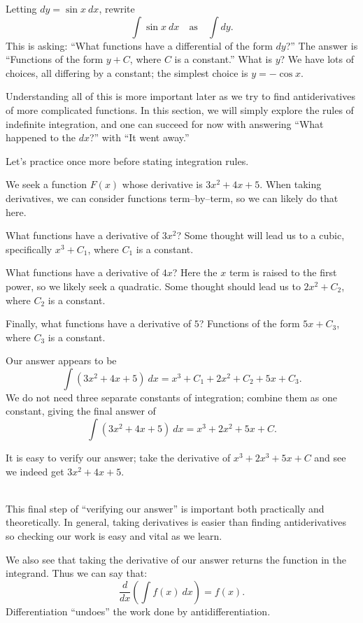 Letting $dy = \sin x\ dx$,  rewrite 
$$\int \sin x \ dx \quad \text{as}\quad \int  dy.$$
This is asking: ``What functions have a differential of the form $dy$?'' The answer is ``Functions of the form $y+C$, where $C$ is a constant.'' What is $y$? We have lots of choices, all differing by a constant; the simplest choice is $y = -\cos x$.

Understanding all of this is more important later as we try to find antiderivatives of more complicated functions. In this section, we will simply explore the rules of indefinite integration, and one can succeed for now with answering ``What happened to the $dx$?'' with ``It went away.''

Let's practice once more before stating integration rules.\\

{We seek a function $F(x)$ whose derivative is $3x^2+4x+5$. When taking derivatives, we can consider functions term--by--term, so we can likely do that here.

What functions have a derivative of $3x^2$? Some thought will lead us to a cubic, specifically $x^3+C_1$, where $C_1$ is a constant. 

What functions have a derivative of $4x$? Here the $x$ term is raised to the first power, so we likely seek a quadratic. Some thought should lead us to $2x^2+C_2$, where $C_2$ is a constant.

Finally, what functions have a derivative of $5$? Functions of the form $5x+C_3$, where $C_3$ is a constant.

Our answer appears to be 
$$\int (3x^2+4x+5)\ dx = x^3+C_1+2x^2+C_2+5x+C_3.$$ We do not need three separate constants of integration; combine them as one constant, giving the final answer of 
$$\int (3x^2+4x+5)\ dx = x^3+2x^2+5x+C.$$

It is easy to verify our answer; take the derivative of $x^3+2x^3+5x+C$ and see we indeed get $3x^2+4x+5$.
}\\

This final step of ``verifying our answer'' is important both practically and theoretically. In general, taking derivatives is easier than finding antiderivatives so checking our work is easy and vital as we learn.

We also see that taking the derivative of our answer returns the function in the integrand. Thus we can say that: $$\frac{d}{dx}\left(\int f(x)\ dx\right) = f(x).$$
Differentiation ``undoes'' the work done by antidifferentiation. 

